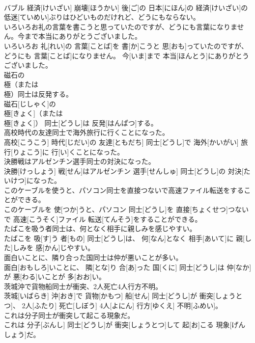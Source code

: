 \documentclass[8pt]{extreport}
\begin{document}
\begin{CJK}{UTF8}{min}
\\	バブル 経済[けいざい] 崩壊[ほうかい] 後[ご]の 日本[にほん]の 経済[けいざい]の 低迷[ていめい]ぶりはひどいものだけれど、どうにもならない。
\\	いろいろお礼の言葉を書こうと思っていたのですが、どうにも言葉になりません。今まで本当にありがとうございました。	
\\	いろいろお 礼[れい]の 言葉[ことば]を 書[か]こうと 思[おも]っていたのですが、どうにも 言葉[ことば]になりません。 今[いま]まで 本当[ほんとう]にありがとうございました。
\\	磁石の
\\	極（または
\\	極）同士は反発する。	
\\	磁石[じしゃく]の 
\\	極[きょく]（または 
\\	極[きょく]） 同士[どうし]は 反発[はんぱつ]する。
\\	高校時代の友達同士で海外旅行に行くことになった。	
\\	高校[こうこう] 時代[じだい]の 友達[ともだち] 同士[どうし]で 海外[かいがい] 旅行[りょこう]に 行[い]くことになった。
\\	決勝戦はアルゼンチン選手同士の対決になった。	
\\	決勝[けっしょう] 戦[せん]はアルゼンチン 選手[せんしゅ] 同士[どうし]の 対決[たいけつ]になった。
\\	このケーブルを使うと、パソコン同士を直接つないで高速ファイル転送をすることができる。	
\\	このケーブルを 使[つか]うと、パソコン 同士[どうし]を 直接[ちょくせつ]つないで 高速[こうそく]ファイル 転送[てんそう]をすることができる。
\\	たばこを吸う者同士は、何となく相手に親しみを感じやすい。	
\\	たばこを 吸[す]う 者[もの] 同士[どうし]は、 何[なん]となく 相手[あいて]に 親[した]しみを 感[かん]じやすい。
\\	面白いことに、隣り合った国同士は仲が悪いことが多い。	
\\	面白[おもしろ]いことに、 隣[とな]り 合[あ]った 国[くに] 同士[どうし]は 仲[なか]が 悪[わる]いことが 多[おお]い。
\\	茨城沖で貨物船同士が衝突、2人死亡4人行方不明。	
\\	茨城[いばらき] 沖[おき]で 貨物[かもつ] 船[せん] 同士[どうし]が 衝突[しょうとつ]、 2人[ふたり] 死亡[しぼう] 4人[よにん] 行方[ゆくえ] 不明[ふめい]。
\\	これは分子同士が衝突して起こる現象だ。	
\\	これは 分子[ぶんし] 同士[どうし]が 衝突[しょうとつ]して 起[お]こる 現象[げんしょう]だ。

\end{CJK}
\end{document}
